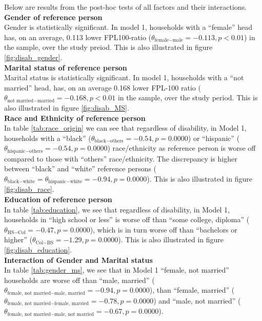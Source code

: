 \documentclass[11pt]{extarticle} %
\begin{document}
Below are results from the post-hoc tests of all factors and their interactions. \\
\noindent
{\bf{Gender of reference person}} \\
Gender is statistically significant. In model 1, households with a ``female'' head has, on an average, 0.113 lower FPL100-ratio ($\theta_{\text{female} - \text{male}} = -0.113, p < 0.01$) in the sample, over the study preiod. This is also illustrated in figure \ref{fig:disab_gender}. \\
\noindent
{\bf{Marital status of reference person}} \\
Marital status is statistically significant. In model 1, households with a ``not married'' head, has, on an average 0.168 lower FPL-100 ratio ($\theta_{\text{not married} - \text{married}} = -0.168, p < 0.01$ in the sample, over the study period. This is also illustrated in figure \ref{fig:disab_MS}.\\
\noindent
{\bf{Race and Ethnicity of reference person}} \\
In table \ref{tab:race_origin} we can see that regardless of disability, in Model 1, households with a ``black'' ($\theta_{\text{black} - \text{others}} = -0.54, p = 0.0000$) or ``hispanic'' ($\theta_{\text{hispanic} - \text{others}} = -0.54, p = 0.0000$) race/ethnicity as reference person is worse off compared to those with ``others'' race/ethnicity. The discrepancy is higher between ``black'' and ``white'' reference persons ($\theta_{\text{black} - \text{white}} = \theta_{\text{hispanic} - \text{white}} = -0.94, p = 0.0000$). This is also illustrated in figure \ref{fig:disab_race}. \\
\noindent
{\bf{Education of reference person}} \\
In table \ref{tab:education}, we see that regardless of disability, in Model 1, households in ``high school or less'' is worse off than ``some college, diploma'' ($\theta_{\text{HS} - \text{Col}} = -0.47, p = 0.0000$), which is in turn worse off than ``bachelors or higher'' ($\theta_{\text{Col} - \text{BS}} = -1.29, p = 0.0000$). This is also illustrated in figure \ref{fig:disab_education}.\\
\noindent
{\bf{Interaction of Gender and Marital status}} \\
In table \ref{tab:gender_ms}, we see that in Model 1 ``female, not married'' households are worse off than ``male, married'' ($\theta_{\text{female, not married} - \text{male, married}} = -0.94, p = 0.0000$), than ``female, married'' ($\theta_{\text{female, not married} - \text{female, married}} = -0.78, p = 0.0000$) and ``male, not married'' ($\theta_{\text{female, not married} - \text{male, not married}} = -0.67, p = 0.0000$). \\
\end{document}
